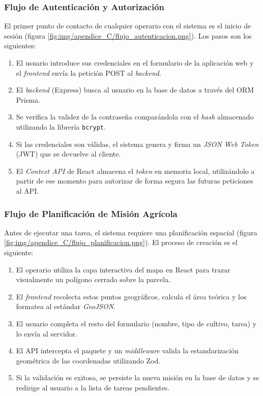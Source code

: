 \subsubsection{Flujo de Autenticación y Autorización}
El primer punto de contacto de cualquier operario con el sistema es el inicio de sesión (figura \ref{fig:img/apendice_C/flujo_autenticacion.png}). Los pasos son los siguientes:
\begin{enumerate}
    \item El usuario introduce sus credenciales en el formulario de la aplicación web y el \textit{frontend} envía la petición POST al \textit{backend}.
    \item El \textit{backend} (Express) busca al usuario en la base de datos a través del ORM Prisma.
    \item Se verifica la validez de la contraseña comparándola con el \textit{hash} almacenado utilizando la librería \texttt{bcrypt}.
    \item Si las credenciales son válidas, el sistema genera y firma un \textit{JSON Web Token} (JWT) que se devuelve al cliente.
    \item El \textit{Context API} de React almacena el \textit{token} en memoria local, utilizándolo a partir de ese momento para autorizar de forma segura las futuras peticiones al API.
\end{enumerate}


\subsubsection{Flujo de Planificación de Misión Agrícola}
Antes de ejecutar una tarea, el sistema requiere una planificación espacial (figura \ref{fig:img/apendice_C/flujo_planificacion.png}). El proceso de creación es el siguiente:
\begin{enumerate}
    \item El operario utiliza la capa interactiva del mapa en React para trazar visualmente un polígono cerrado sobre la parcela.
    \item El \textit{frontend} recolecta estos puntos geográficos, calcula el área teórica y los formatea al estándar \textit{GeoJSON}.
    \item El usuario completa el resto del formulario (nombre, tipo de cultivo, tarea) y lo envía al servidor.
    \item El API intercepta el paquete y un \textit{middleware} valida la estandarización geométrica de las coordenadas utilizando Zod.
    \item Si la validación es exitosa, se persiste la nueva misión en la base de datos y se redirige al usuario a la lista de tareas pendientes.
\end{enumerate}

